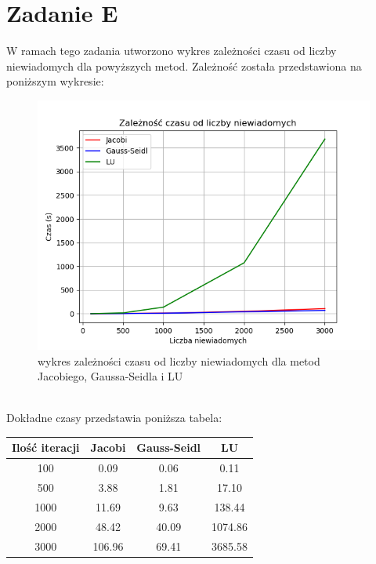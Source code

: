 \documentclass{article} %
\begin{document}
\section{Zadanie E}
W ramach tego zadania utworzono wykres zależności czasu od liczby niewiadomych dla powyższych metod. Zależność została przedstawiona na poniższym wykresie: \\
\begin{figure}[h]
    \centering
    \includegraphics[scale=0.7]{wykres.png}
    \caption{ wykres zależności czasu od liczby niewiadomych dla metod Jacobiego, Gaussa-Seidla i LU}
\end{figure} \\
Dokładne czasy przedstawia poniższa tabela:
\begin{center} 
    \begin{tabular}  { | c | c | c | c |  }
        \hline
       Ilość iteracji & Jacobi & Gauss-Seidl & LU \\
       \hline
       100 & 0.09 & 0.06 & 0.11\\
       \hline
       500 & 3.88 & 1.81 & 17.10 \\
       \hline
       1000 & 11.69 & 9.63 & 138.44 \\
       \hline
       2000 & 48.42 & 40.09 & 1074.86 \\
       \hline
       3000 & 106.96 & 69.41 & 3685.58 \\
       \hline
    \end{tabular}
\end{center}
\end{document}
